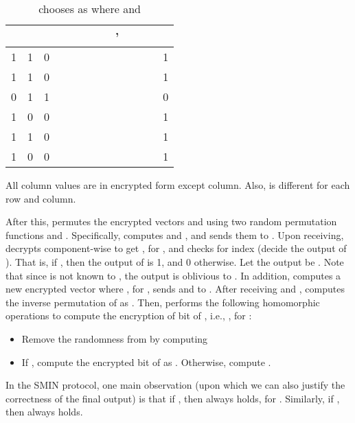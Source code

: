 \documentclass{article}
\begin{document}
\begin{table}[!t]
\centering
\caption{  chooses  as  where  and } \begin{tabular}{ccccccccccccc}  
     \hline &\;&\; &\;&\;&\;&\;&\;&\;'&\;&\;&\;&\;\\ [1ex] \hline 1&1&0&  & &   & &&&&& & 1\\ 
    	1&1&0&  & &   & &&&&& & 1\\  
    	0&1&1&  & &  & & &&&&& 0\\   
    	1&0&0&  & &&&&&&& & 1\\   
    	1&1&0&  && &&&& && & 1\\  
    	1&0&0&  & &&&&&&& & 1\\  \hline \end{tabular}\begin{tablenotes}
      \small
      \item All column values are in encrypted form except  column. Also, 
 is different for each row and column. 
\end{tablenotes}

\label{table:SMIN-example} \end{table} 
After this,  permutes the encrypted vectors  and  using two random permutation 
functions  and . Specifically,  computes  and 
, and sends them to . Upon receiving,  decrypts  component-wise to get 
, for , 
and checks for index  (decide the output of ). That is, if 
, then the output of  is 1, and 0 otherwise. Let the output 
be . Note that since 
 is not known to , the output  is oblivious to . In addition,  computes a new encrypted vector  where 
, for , sends  and  to 
. After receiving  and ,  computes the inverse permutation of  
as . Then,  performs the following homomorphic 
operations to compute the encryption of  bit of , i.e., 
, for :
\begin{itemize}
\item Remove the randomness from  by 
computing 
\item If , compute the  encrypted bit of  as 
. Otherwise, compute
.
\end{itemize}
In the SMIN protocol, one main observation (upon 
which we can also justify the correctness of the final output) is that 
if , then  always holds, for . 
Similarly, if , then  always holds.
\end{document}
